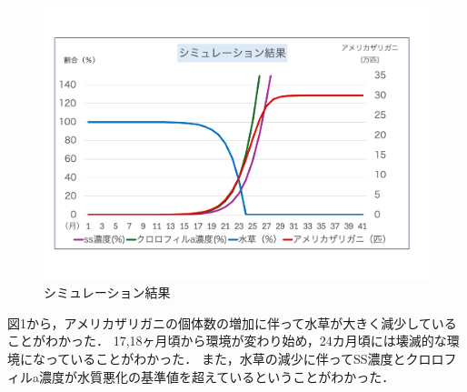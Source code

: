\documentclass[twocolumn,10pt,a4j]{ltjsarticle}
\begin{document}
\begin{figure}[h]
\begin{center}
  \includegraphics[width=.95\columnwidth]{graph6.pdf}
\end{center}
  \caption{シミュレーション結果\\}
  \label{fig:切り替え}
\end{figure}
図1から，アメリカザリガニの個体数の増加に伴って水草が大きく減少していることがわかった．
17,18ヶ月頃から環境が変わり始め，24カ月頃には壊滅的な環境になっていることがわかった．
また，水草の減少に伴ってSS濃度とクロロフィルa濃度が水質悪化の基準値を超えているということがわかった．




\end{document}
